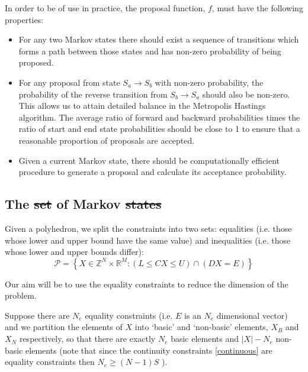 \documentclass{article}
\providecommand{\DIFaddtex}[1]{{\protect\color{blue}\uwave{#1}}} %
\providecommand{\DIFdeltex}[1]{{\protect\color{red}\sout{#1}}}                      %
\providecommand{\DIFaddbegin}{} %
\providecommand{\DIFaddend}{} %
\providecommand{\DIFdelbegin}{} %
\providecommand{\DIFdelend}{} %
\providecommand{\DIFadd}[1]{\texorpdfstring{\DIFaddtex{#1}}{#1}} %
\providecommand{\DIFdel}[1]{\texorpdfstring{\DIFdeltex{#1}}{}} %
\newcommand{\DIFscaledelfig}{0.5}
\newlength{\DIFdelgraphicswidth} %
\newlength{\DIFdelgraphicsheight} %
\newcommand{\DIFaddincludegraphics}[2][]{{\color{blue}\fbox{\DIFOincludegraphics[#1]{#2}}}} %
\newcommand{\DIFdelincludegraphics}[2][]{%
\sbox{\DIFdelgraphicsbox}{\DIFOincludegraphics[#1]{#2}}%
\settoboxwidth{\DIFdelgraphicswidth}{\DIFdelgraphicsbox} %
\settoboxtotalheight{\DIFdelgraphicsheight}{\DIFdelgraphicsbox} %
\scalebox{\DIFscaledelfig}{%
\parbox[b]{\DIFdelgraphicswidth}{\usebox{\DIFdelgraphicsbox}\\[-\baselineskip] \rule{\DIFdelgraphicswidth}{0em}}\llap{\resizebox{\DIFdelgraphicswidth}{\DIFdelgraphicsheight}{%
\setlength{\unitlength}{\DIFdelgraphicswidth}%
\begin{picture}(1,1)%
\thicklines\linethickness{2pt} %
{\color[rgb]{1,0,0}\put(0,0){\framebox(1,1){}}}%
{\color[rgb]{1,0,0}\put(0,0){\line( 1,1){1}}}%
{\color[rgb]{1,0,0}\put(0,1){\line(1,-1){1}}}%
\end{picture}%
}\hspace*{3pt}}} %
} %
\DeclareRobustCommand{\DIFaddbegin}{\DIFOaddbegin \let\includegraphics\DIFaddincludegraphics} %
\DeclareRobustCommand{\DIFaddend}{\DIFOaddend \let\includegraphics\DIFOincludegraphics} %
\DeclareRobustCommand{\DIFdelbegin}{\DIFOdelbegin \let\includegraphics\DIFdelincludegraphics} %
\DeclareRobustCommand{\DIFdelend}{\DIFOaddend \let\includegraphics\DIFOincludegraphics} %
\begin{document}
In order to be of use in practice, the proposal function, $f$, must have the following properties:
\begin{itemize}
	\item For any two Markov states there should exist a sequence of transitions which forms a path between those states and has non-zero probability of being proposed.

	\item For any proposal from state $S_a \to S_b$ with non-zero probability, the probability of the reverse transition from $S_b \to S_a$ should also be non-zero. This allows us to attain detailed balance in the Metropolis Hastings algorithm. The average ratio of forward and backward probabilities times the ratio of start and end state probabilities should be close to 1 to ensure that a reasonable proportion of proposals are accepted.

	\item Given a current Markov state, there should be computationally efficient procedure to generate a proposal and calculate its acceptance probability. 
\end{itemize}

\subsection{The \DIFdelbegin \DIFdel{set }\DIFdelend \DIFaddbegin \DIFadd{Set }\DIFaddend of Markov \DIFdelbegin \DIFdel{states}\DIFdelend \DIFaddbegin \DIFadd{States}\DIFaddend }

Given a polyhedron, we split the constraints into two sets: equalities (i.e. those whose lower and upper bound have the same value) and inequalities (i.e. those whose lower and upper bounds differ):
\begin{equation}
\mathcal{P} = \left\{X \in \mathbb{Z}^N \times \mathbb{R}^M: \left(L \le CX \le U\right) \cap \left(DX = E\right) \right\}
\label{zPolySupport}
\end{equation}

Our aim will be to use the equality constraints to reduce the dimension of the problem.

Suppose there are $N_e$ equality constraints (i.e. $E$ is an $N_e$ dimensional vector) and we partition the elements of $X$ into `basic' and `non-basic' elements, $X_B$ and $X_N$ respectively, so that there are exactly $N_e$ basic elements and $|X| - N_e$ non-basic elements (note that since the continuity constraints \eqref{continuous} are equality constraints then $N_e \ge (N-1)S$ ).
\end{document}
